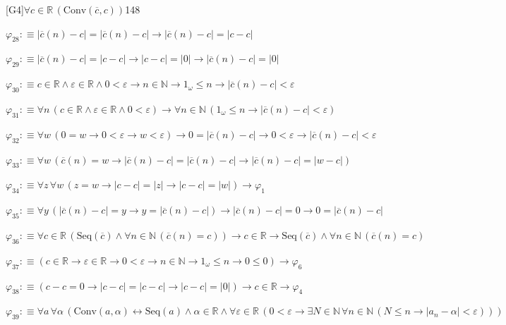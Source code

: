 \begin{fullproof}{[G4]}{$\forall c \in \mathbb{R}\,(\mathrm{Conv}(\overline{c},c))$}{148}
\begin{abbrevlist}
\item $\varphi_{28} :\equiv \lvert \overline{c}(n) - c \rvert = \lvert \overline{c}(n) - c \rvert \to \lvert \overline{c}(n) - c \rvert = \lvert c - c \rvert$
\item $\varphi_{29} :\equiv \lvert \overline{c}(n) - c \rvert = \lvert c - c \rvert \to \lvert c - c \rvert = \lvert 0 \rvert \to \lvert \overline{c}(n) - c \rvert = \lvert 0 \rvert$
\item $\varphi_{30} :\equiv c \in \mathbb{R} \land \varepsilon \in \mathbb{R} \land 0 < \varepsilon \to n \in \mathbb{N} \to 1_{\omega} \leq n \to \lvert \overline{c}(n) - c \rvert < \varepsilon$
\item $\varphi_{31} :\equiv \forall n\,(c \in \mathbb{R} \land \varepsilon \in \mathbb{R} \land 0 < \varepsilon) \to \forall n \in \mathbb{N}\,(1_{\omega} \leq n \to \lvert \overline{c}(n) - c \rvert < \varepsilon)$
\item $\varphi_{32} :\equiv \forall w\,(0 = w \to 0 < \varepsilon \to w < \varepsilon) \to 0 = \lvert \overline{c}(n) - c \rvert \to 0 < \varepsilon \to \lvert \overline{c}(n) - c \rvert < \varepsilon$
\item $\varphi_{33} :\equiv \forall w\,(\overline{c}(n) = w \to \lvert \overline{c}(n) - c \rvert = \lvert \overline{c}(n) - c \rvert \to \lvert \overline{c}(n) - c \rvert = \lvert w - c \rvert)$
\item $\varphi_{34} :\equiv \forall z\,\forall w\,(z = w \to \lvert c - c \rvert = \lvert z \rvert \to \lvert c - c \rvert = \lvert w \rvert) \to \varphi_{1}$
\item $\varphi_{35} :\equiv \forall y\,(\lvert \overline{c}(n) - c \rvert = y \to y = \lvert \overline{c}(n) - c \rvert) \to \lvert \overline{c}(n) - c \rvert = 0 \to 0 = \lvert \overline{c}(n) - c \rvert$
\item $\varphi_{36} :\equiv \forall c \in \mathbb{R}\,(\mathrm{Seq}(\overline{c}) \land \forall n \in \mathbb{N}\,(\overline{c}(n) = c)) \to c \in \mathbb{R} \to \mathrm{Seq}(\overline{c}) \land \forall n \in \mathbb{N}\,(\overline{c}(n) = c)$
\item $\varphi_{37} :\equiv (c \in \mathbb{R} \to \varepsilon \in \mathbb{R} \to 0 < \varepsilon \to n \in \mathbb{N} \to 1_{\omega} \leq n \to 0 \leq 0) \to \varphi_{6}$
\item $\varphi_{38} :\equiv (c - c = 0 \to \lvert c - c \rvert = \lvert c - c \rvert \to \lvert c - c \rvert = \lvert 0 \rvert) \to c \in \mathbb{R} \to \varphi_{4}$
\item $\varphi_{39} :\equiv \forall a\,\forall \alpha\,(\mathrm{Conv}(a,\alpha) \leftrightarrow \mathrm{Seq}(a) \land \alpha \in \mathbb{R} \land \forall \varepsilon \in \mathbb{R}\,(0 < \varepsilon \to \exists N \in \mathbb{N}\,\forall n \in \mathbb{N}\,(N \leq n \to \lvert a_{n} - \alpha \rvert < \varepsilon)))$

\end{abbrevlist}
\end{fullproof}
